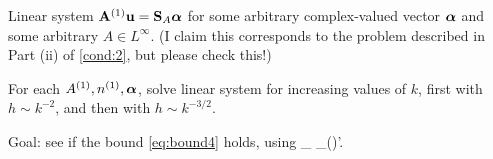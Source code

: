 \item Linear system $\mathbf{A}^{(1)} \mathbf{u} = \mathbf{S}_{A} {\boldsymbol{\alpha}}$ for some arbitrary complex-valued vector ${\boldsymbol{\alpha}}$ and some arbitrary $A\in L^\infty$. (I claim this corresponds to the problem described in Part (ii) of \cref{cond:2},  but please check this!)
\item For each ${A}^{(1)}, {n}^{(1)}, {\boldsymbol{\alpha}}$, solve linear system for increasing values of $k$, first with $h\sim k^{-2}$, and then with $h\sim k^{-3/2}$.
\item Goal: see if the bound \cref{eq:bound4} holds, using 
\beqs
{}_{\LtDR} \quad {} \quad \N{\LE}_{(\HokDR)'}.
\eeqs
\eit
\een

